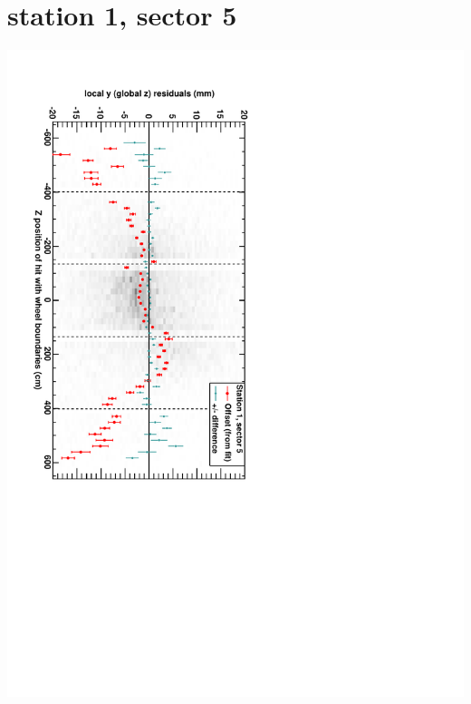 \documentclass[compress]{beamer}
\begin{document}
\section*{station 1, sector 5}
\begin{frame} \vfill \mbox{\hspace{-1 cm}\includegraphics[height=1.2\linewidth, angle=90]{DTzVsZ_st1_sr05.pdf}} \end{frame}
\end{document}
